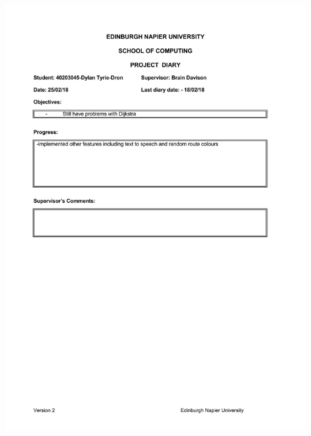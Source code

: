 \documentclass[12pt,a4paper]{article}
\begin{document}
\begin{appendices}
\includegraphics[width=\textwidth,height=\textheight,keepaspectratio]{project_diary_12th_entry.pdf}

\end{appendices}
\end{document}

